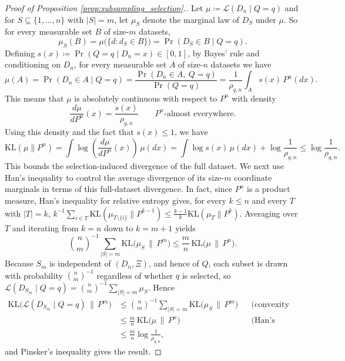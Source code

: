 \documentclass[10pt]{article}
\begin{document}
\begin{proof}[Proof of Proposition \ref{prop:subsampling_selection}.]
Let $\mu\coloneqq\mathcal L(D_n\mid Q=q)$ and for $S\subseteq\{1,\dots,n\}$ with $|S|=m$, let $\mu_S$ denote the marginal law of $D_S$ under $\mu$. So for every measurable set $B$ of size-$m$ datasets,
\[
\mu_S(B) =\mu\bigl(\{d:d_S\in B\}\bigr) =\Pr(D_S\in B\mid Q=q).
\]
Defining $s(x)\coloneqq\Pr(Q=q\mid D_n=x)\in[0,1]$, by Bayes' rule and conditioning on $D_n$, for every measurable set $A$ of size-$n$ datasets we have
\[
\mu(A)=\Pr(D_n\in A\mid Q=q)=\frac{\Pr(D_n\in A,\ Q=q)}{\Pr(Q=q)}
=\frac{1}{\rho_{q,n}}\int_A s(x)\,P^n(dx).
\]
This means that $\mu$ is absolutely continuous with respect
to $P^n$ with density
\[
\frac{d\mu}{dP^n}(x)=\frac{s(x)}{\rho_{q,n}}
\qquad P^n\text{-almost everywhere}.
\]
Using this density and the fact that $s(x)\le 1$, we have
\[
\mathrm{KL}(\mu\|P^n)=\int \log\!\left(\frac{d\mu}{dP^n}(x)\right)\,\mu(dx)
=\int \log s(x)\,\mu(dx)+\log\frac{1}{\rho_{q,n}}\le \log\frac{1}{\rho_{q,n}}.
\]
This bounds the selection-induced divergence of the full dataset.
We next use Han's inequality to control the average divergence
of its size-$m$ coordinate marginals in terms of this full-dataset
divergence. In fact, since $P^n$ is a product measure, Han's inequality for relative entropy
\citetext{\citealp{han1978nonnegative}; \citealp[Theorem~4.9]{boucheron2013concentration}} gives, for every $k\le n$ and every
$T$ with $|T|=k$, $k^{-1}\sum_{i\in T}\mathrm{KL}(\mu_{T\setminus\{i\}}\|P^{k-1})
\le\frac{k-1}{k}\mathrm{KL}(\mu_T\|P^k)$. Averaging over $T$ and iterating
from $k=n$ down to $k=m+1$ yields
\[
\binom{n}{m}^{-1}\sum_{|S|=m}\mathrm{KL}\big(\mu_S\,\|\,P^m\big)
\le\frac{m}{n}\,\mathrm{KL}\big(\mu\,\|\,P^n\big).
\]
Because $S_m$ is independent of $(D_n,\Xi)$, and hence of $Q$, each subset is
drawn with probability $\binom{n}{m}^{-1}$ regardless of whether $q$ is
selected, so $\mathcal L(D_{S_m}\mid Q=q)=\binom{n}{m}^{-1}\sum_{|S|=m}\mu_S$.
Hence
\begin{align*}
\mathrm{KL}\big(\mathcal L(D_{S_m}\mid Q=q)\,\|\,P^m\big)
&\le\binom{n}{m}^{-1}\sum_{|S|=m}\mathrm{KL}\big(\mu_S\,\|\,P^m\big)
&&\text{(convexity of relative entropy)}\\
&\le\frac{m}{n}\,\mathrm{KL}\big(\mu\,\|\,P^n\big)
&&\text{(Han's inequality)}\\
&\le\frac{m}{n}\log\frac{1}{\rho_{q,n}},
\end{align*}
and Pinsker's inequality \citetext{\citealp{pinsker1964information}; \citealp[Theorem~4.19]{boucheron2013concentration}} gives the result.
\end{proof}
\end{document}
